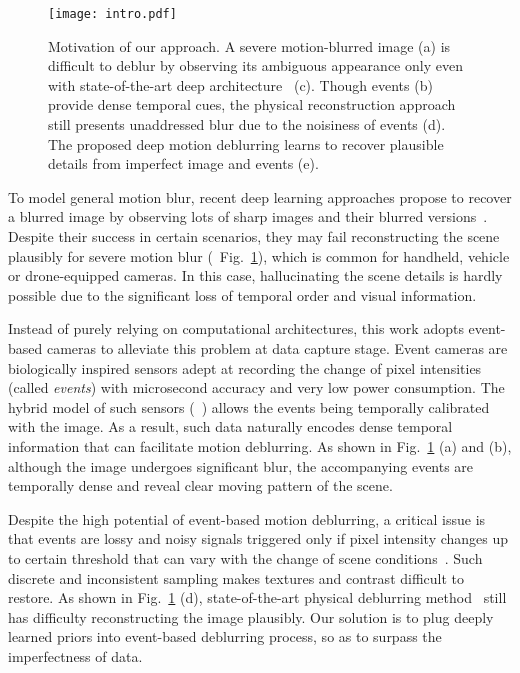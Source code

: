 \documentclass[10pt,twocolumn,letterpaper]{article}
\begin{document}
\begin{figure}[!t]
	\centering
	\texttt{[image: intro.pdf]}
	\caption{Motivation of our approach. A severe motion-blurred image (a) is difficult to deblur by observing its ambiguous appearance only even with state-of-the-art deep architecture~\cite{ZhangCVPR19} (c). Though events (b) provide dense temporal cues, the physical reconstruction approach~\cite{PanCVPR19} still presents unaddressed blur due to the noisiness of events (d). The proposed deep motion deblurring learns to recover plausible details from imperfect image and events (e).}
	\label{fig:intro}
	\vspace{-3mm}
\end{figure}

To model general motion blur, recent deep learning approaches propose to recover a blurred image by observing lots of sharp images and their blurred versions~\cite{SunCVPR15,GongCVPR17,ZhangCVPR18,NahCVPR17,JinCVPR18,TaoCVPR18}. Despite their success in certain scenarios, they may fail reconstructing the scene plausibly for severe motion blur (\eg~Fig.~\ref{fig:intro}), which is common for handheld, vehicle or drone-equipped cameras. In this case, hallucinating the scene details is hardly possible due to the significant loss of temporal order and visual information.

Instead of purely relying on computational architectures, this work adopts event-based cameras to alleviate this problem at data capture stage. Event cameras are biologically inspired sensors adept at recording the change of pixel intensities (called \textit{events}) with microsecond accuracy and very low power consumption. The hybrid model of such sensors (\eg~\cite{BrandliJSSC14}) allows the events being temporally calibrated with the image. As a result, such data naturally encodes dense temporal information that can facilitate motion deblurring. As shown in Fig.~\ref{fig:intro} (a) and (b), although the image undergoes significant blur, the accompanying events are temporally dense and reveal clear moving pattern of the scene.

Despite the high potential of event-based motion deblurring, a critical issue is that events are lossy and noisy signals triggered only if pixel intensity changes up to certain threshold that can vary with the change of scene conditions~\cite{RebecqCORL18}. Such discrete and inconsistent sampling makes textures and contrast difficult to restore. As shown in Fig.~\ref{fig:intro} (d), state-of-the-art physical deblurring method~\cite{PanCVPR19} still has difficulty reconstructing the image plausibly. Our solution is to plug deeply learned priors into event-based deblurring process, so as to surpass the imperfectness of data.
\end{document}
